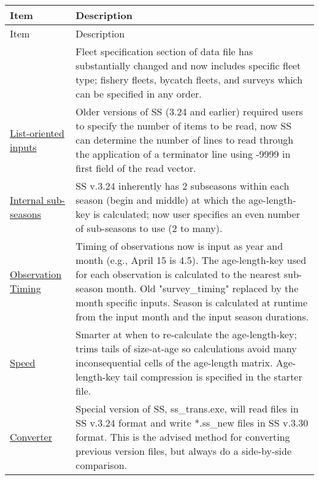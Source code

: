 		
\begin{center}
	{\renewcommand{\arraystretch}{1.5}%
	\begin{longtable}{p{1.75cm} p{9.5cm}}
		\hline
		Item &  Description\\
		\hline
		\endfirsthead
		\hline
		\toprule
		Item &  Description\\
		\hline
		\endhead

		\hline
		\endfoot

		\endlastfoot
		
		\multicolumn{1}{l}{\hyperlink{GenericFleets}{Generic Fleets}} & 
				Fleet specification section of data file has substantially changed and now includes specific fleet type; fishery fleets, bycatch fleets, and surveys which can be specified in any order.\\

		\multicolumn{1}{l}{\hyperlink{ListBased}{List-oriented inputs}} & 
			    Older versions of SS (3.24 and earlier) required users to specify the number of items to be read, now SS can determine the number of lines to read through the application of a terminator line using -9999 in first field of the read vector. \\
		  
		\multicolumn{1}{l}{\hyperlink{SubSeas}{Internal sub-seasons}} & 
			    SS v.3.24 inherently has 2 subseasons within each season (begin and middle) at which the age-length-key is calculated; now user specifies an even number of sub-seasons to use (2 to many). \\

		\multicolumn{1}{l}{\hyperlink{ObsTiming}{Observation Timing}} & 
			    Timing of observations now is input as year and month (e.g., April 15 is 4.5). The age-length-key used for each observation is calculated to the nearest sub-season month.  Old "survey\_timing" replaced by the month specific inputs.  Season is calculated at runtime from the input month and the input season durations. \\

		\multicolumn{1}{l}{\hyperlink{ALK}{Speed}} & 
			    Smarter at when to re-calculate the age-length-key; trims tails of size-at-age so calculations avoid many inconsequential cells of the age-length matrix. Age-length-key tail compression is specified in the starter file.\\
		
		\multicolumn{1}{l}{\hyperlink{Convert} {Converter}} & 
			    Special version of SS, ss\_trans.exe, will read files in SS v.3.24 format and write *.ss\_new files in SS v.3.30 format.  This is the advised method for converting previous version files, but always do a side-by-side comparison.\\


\end{longtable}}
\end{center}
